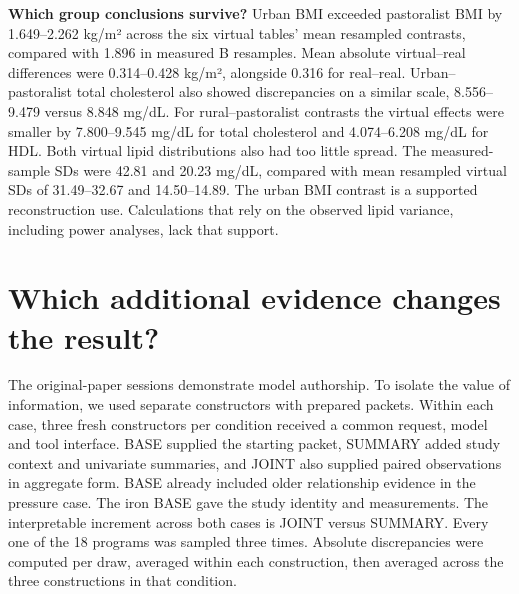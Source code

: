 \documentclass[sigconf,anonymous,nonacm]{acmart}
\begin{document}
\textbf{Which group conclusions survive?} Urban BMI exceeded pastoralist BMI by 1.649–\allowbreak{}2.262 kg/\allowbreak{}m² across the six virtual tables' mean resampled contrasts, compared with 1.896 in measured B resamples. Mean absolute virtual–\allowbreak{}real differences were 0.314–\allowbreak{}0.428 kg/\allowbreak{}m², alongside 0.316 for real–\allowbreak{}real. Urban–\allowbreak{}pastoralist total cholesterol also showed discrepancies on a similar scale, 8.556–\allowbreak{}9.479 versus 8.848 mg/\allowbreak{}dL. For rural–\allowbreak{}pastoralist contrasts the virtual effects were smaller by 7.800–\allowbreak{}9.545 mg/\allowbreak{}dL for total cholesterol and 4.074–\allowbreak{}6.208 mg/\allowbreak{}dL for HDL. Both virtual lipid distributions also had too little spread. The measured-sample SDs were 42.81 and 20.23 mg/\allowbreak{}dL, compared with mean resampled virtual SDs of 31.49–\allowbreak{}32.67 and 14.50–\allowbreak{}14.89. The urban BMI contrast is a supported reconstruction use. Calculations that rely on the observed lipid variance, including power analyses, lack that support.


\section{Which additional evidence changes the result?}

The original-paper sessions demonstrate model authorship. To isolate the value of information, we used separate constructors with prepared packets. Within each case, three fresh constructors per condition received a common request, model and tool interface. BASE supplied the starting packet, SUMMARY added study context and univariate summaries, and JOINT also supplied paired observations in aggregate form. BASE already included older relationship evidence in the pressure case. The iron BASE gave the study identity and measurements. The interpretable increment across both cases is JOINT versus SUMMARY. Every one of the 18 programs was sampled three times. Absolute discrepancies were computed per draw, averaged within each construction, then averaged across the three constructions in that condition.
\end{document}
